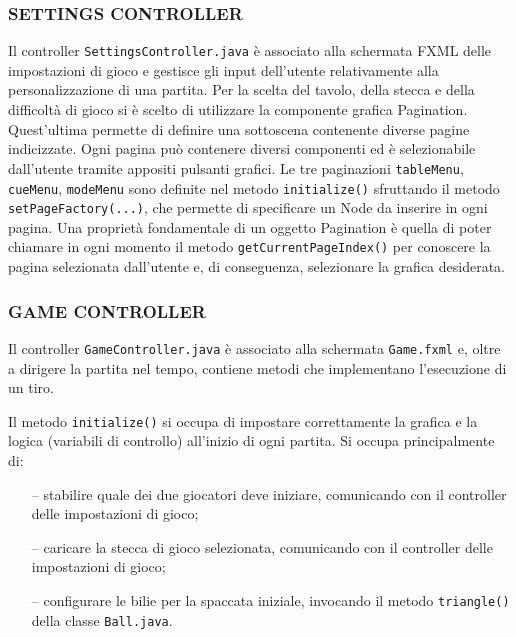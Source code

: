 \documentclass[12pt,a4paper]{report}
\begin{document}
\subsubsection*{SETTINGS CONTROLLER}
Il controller \texttt{SettingsController.java} è associato alla schermata FXML delle impostazioni di gioco e gestisce gli input dell'utente relativamente alla personalizzazione di una partita.
Per la scelta del tavolo, della stecca e della difficoltà di gioco si è scelto di utilizzare la componente grafica Pagination.
Quest'ultima permette di definire una sottoscena contenente diverse pagine indicizzate.
Ogni pagina può contenere diversi componenti ed è selezionabile dall'utente tramite appositi pulsanti grafici.
Le tre paginazioni \texttt{tableMenu}, \texttt{cueMenu}, \texttt{modeMenu} sono definite nel metodo \texttt{initialize()} sfruttando il metodo \texttt{setPageFactory(...)}, che permette di specificare un Node da inserire in ogni pagina.
Una proprietà fondamentale di un oggetto Pagination è quella di poter chiamare in ogni momento il metodo \texttt{getCurrentPageIndex()} per conoscere la pagina selezionata dall'utente e, di conseguenza, selezionare la grafica desiderata.

\subsubsection*{GAME CONTROLLER}
Il controller \texttt{GameController.java} è associato alla schermata \texttt{Game.fxml} e, oltre a dirigere la partita nel tempo, contiene metodi che implementano l'esecuzione di un tiro.

\vspace{3mm}

Il metodo \texttt{initialize()} si occupa di impostare correttamente la grafica e la logica (variabili di controllo) all'inizio di ogni partita.
Si occupa principalmente di:
\begin{itemize}
	\item [--] stabilire quale dei due giocatori deve iniziare, comunicando con il controller delle impostazioni di gioco;
	\item [--] caricare la stecca di gioco selezionata, comunicando con il controller delle impostazioni di gioco;
	\item [--] configurare le bilie per la spaccata iniziale, invocando il metodo \texttt{triangle()} della classe \texttt{Ball.java}.
\end{itemize}

\vspace{3mm}
\end{document}
